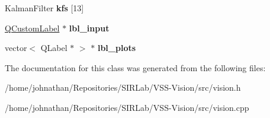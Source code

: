 \begin{DoxyCompactItemize}
\item 
Kalman\+Filter {\bfseries kfs} \mbox{[}13\mbox{]}\hypertarget{classvision_a76bf5d0bd645d4db2d9535bacae1284f}{}\label{classvision_a76bf5d0bd645d4db2d9535bacae1284f}

\item 
\hyperlink{classQCustomLabel}{Q\+Custom\+Label} $\ast$ {\bfseries lbl\+\_\+input}\hypertarget{classvision_ae925689fd0bd2eb2fcf2159e2f7b251e}{}\label{classvision_ae925689fd0bd2eb2fcf2159e2f7b251e}

\item 
vector$<$ Q\+Label $\ast$ $>$ $\ast$ {\bfseries lbl\+\_\+plots}\hypertarget{classvision_a4ec174995015376fcc9c15add83ed422}{}\label{classvision_a4ec174995015376fcc9c15add83ed422}

\end{DoxyCompactItemize}


The documentation for this class was generated from the following files\+:\begin{DoxyCompactItemize}
\item 
/home/johnathan/\+Repositories/\+S\+I\+R\+Lab/\+V\+S\+S-\/\+Vision/src/vision.\+h\item 
/home/johnathan/\+Repositories/\+S\+I\+R\+Lab/\+V\+S\+S-\/\+Vision/src/vision.\+cpp\end{DoxyCompactItemize}
